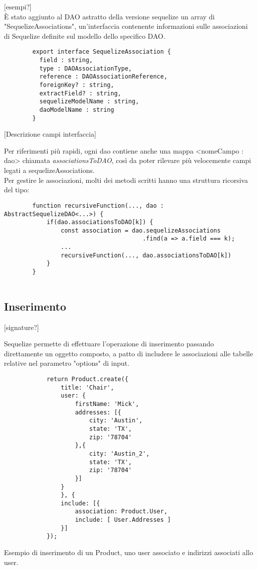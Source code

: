 \documentclass[a4paper, 12pt]{scrartcl}
\begin{document}
      [esempi?]\\

      È stato aggiunto al DAO astratto della versione sequelize un array di "SequelizeAssociations", un'interfaccia contenente informazioni sulle associazioni di Sequelize definite sul modello dello specifico DAO.\\
      \begin{verbatim}
        export interface SequelizeAssociation {
          field : string,
          type : DAOAssociationType,
          reference : DAOAssociationReference,
          foreignKey? : string,
          extractField? : string,
          sequelizeModelName : string,
          daoModelName : string
        }  
      \end{verbatim}
      
      [Descrizione campi interfaccia]

      Per riferimenti più rapidi, ogni dao contiene anche una mappa <nomeCampo : dao> chiamata \emph{associationsToDAO}, così da poter rilevare più velocemente campi legati a sequelizeAssociations.\\
      Per gestire le associazioni, molti dei metodi scritti hanno una struttura ricorsiva del tipo:
      \begin{verbatim}
        function recursiveFunction(..., dao : AbstractSequelizeDAO<...>) {
            if(dao.associationsToDAO[k]) {
                const association = dao.sequelizeAssociations
                                       .find(a => a.field === k);
                ...
                recursiveFunction(..., dao.associationsToDAO[k])
            }
        }
        
      \end{verbatim}

      \subsection*{Inserimento}
          [signature?]
          
          Sequelize permette di effettuare l'operazione di inserimento passando direttamente un oggetto composto, a patto di includere le associazioni alle tabelle relative
          nel parametro "options" di input.
          \begin{verbatim}
            return Product.create({
                title: 'Chair',
                user: {
                    firstName: 'Mick',
                    addresses: [{
                        city: 'Austin',
                        state: 'TX',
                        zip: '78704'
                    },{
                        city: 'Austin_2',
                        state: 'TX',
                        zip: '78704'
                    }]
                }
                }, {
                include: [{
                    association: Product.User,
                    include: [ User.Addresses ]
                }]
            });
          \end{verbatim}
          Esempio di inserimento di un Product, uno user associato e indirizzi associati allo user.
\end{document}
